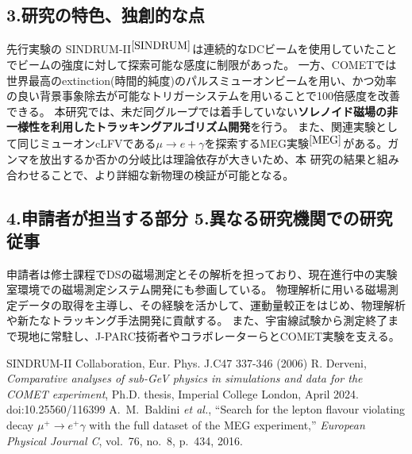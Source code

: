 \documentclass[11pt,a4j,dvipdfmx]{jarticle} 					%
\newcommand{\研究課題名}{COMET Phase-Iに向けたエンジニアリングランおよびその物理解析}
\newcommand{\研究機関名}{大阪大学}
\newcommand{\研究代表者氏名}{高見 翔太   }
\newcommand{\mysubsection}[1]{\vspace{-20pt}\subsection*{\colorbox{cyan!15}{\normalsize{#1}}}\vspace{-0.2cm}}
\begin{document}
\mysubsection{3.研究の特色、独創的な点}
先行実験の SINDRUM-I\hspace{-1.2pt}I$^{\cite{SINDRUM}}$は連続的なDCビームを使用していたことでビームの強度に対して探索可能な感度に制限があった。
一方、COMETでは世界最高のextinction(時間的純度)のパルスミューオンビームを用い、かつ効率の良い背景事象除去が可能なトリガーシステムを用いることで100倍感度を改善できる。
本研究では、未だ同グループでは着手していない\textbf{ソレノイド磁場の非一様性を利用したトラッキングアルゴリズム開発}を行う。
また、関連実験として同じミューオンcLFVである$\mu \rightarrow e + \gamma$を探索するMEG実験$^{\cite{MEG}}$がある。ガンマを放出するか否かの分岐比は理論依存が大きいため、本
研究の結果と組み合わせることで、より詳細な新物理の検証が可能となる。
\mysubsection{4.申請者が担当する部分 5.異なる研究機関での研究従事}
申請者は修士課程でDSの磁場測定とその解析を担っており、現在進行中の実験室環境での磁場測定システム開発にも参画している。
物理解析に用いる磁場測定データの取得を主導し、その経験を活かして、運動量較正をはじめ、物理解析や新たなトラッキング手法開発に貢献する。
また、宇宙線試験から測定終了まで現地に常駐し、J-PARC技術者やコラボレーターらとCOMET実験を支える。
\small
\begin{thebibliography}{99}
	 SINDRUM-II Collaboration, Eur. Phys. J.C47 337-346 (2006)
  R. Derveni, 
  \emph{Comparative analyses of sub-GeV physics in simulations and data for the COMET experiment},  
  Ph.D. thesis, Imperial College London, April 2024.  
	{doi:10.25560/116399}
	A.~M.~Baldini \textit{et al.}, ``Search for the lepton flavour violating decay $\mu^+ \to e^+ \gamma$ with the full dataset of the MEG experiment,'' \textit{European Physical Journal C}, vol.~76, no.~8, p.~434, 2016. 
\end{thebibliography}
\end{document}
